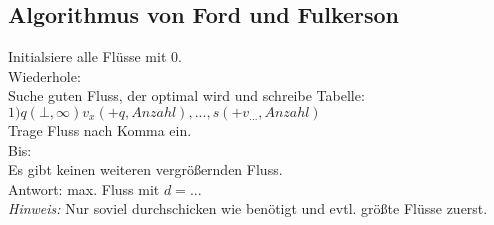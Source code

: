 \subsection*{Algorithmus von Ford und Fulkerson}
Initialsiere alle Flüsse mit 0.\\
Wiederhole:\\
	Suche guten Fluss, der optimal wird und schreibe Tabelle:\\
	$1) q(\bot,\infty) v_x(+q,Anzahl), ... , s(+v_{...},Anzahl)$\\
	Trage Fluss nach Komma ein.\\
Bis:\\
Es gibt keinen weiteren vergrößernden Fluss.\\
Antwort: max. Fluss mit $d=...$\\
\emph{Hinweis:} Nur soviel durchschicken wie benötigt und evtl. größte Flüsse zuerst.

\break